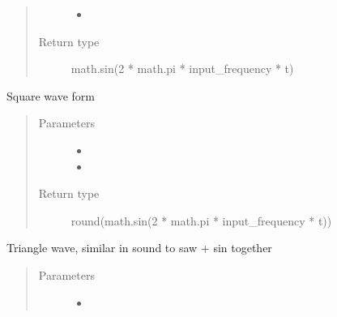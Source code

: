 \documentclass[letterpaper,10pt,english]{sphinxmanual}
\begin{document}
\begin{fulllineitems}
\begin{fulllineitems}
\begin{quote}
\begin{description}
\begin{itemize}
\item {} 
\sphinxAtStartPar
{} \textendash{} 

\end{itemize}

\item[{Return type}] \leavevmode
\sphinxAtStartPar
math.sin(2 * math.pi * input\_frequency * t)

\end{description}\end{quote}

\end{fulllineitems}


\begin{fulllineitems}
\label{\detokenize{audio:audio.wave_table.square}}
\pysigstartsignatures
{}
\pysigstopsignatures
\sphinxAtStartPar
Square wave form
\begin{quote}\begin{description}
\item[{Parameters}] \leavevmode\begin{itemize}
\item {} 
\sphinxAtStartPar
{} \textendash{} 

\item {} 
\sphinxAtStartPar
{} \textendash{} 

\end{itemize}

\item[{Return type}] \leavevmode
\sphinxAtStartPar
round(math.sin(2 * math.pi * input\_frequency * t))

\end{description}\end{quote}

\end{fulllineitems}


\begin{fulllineitems}
\label{\detokenize{audio:audio.wave_table.triangle}}
\pysigstartsignatures
{}
\pysigstopsignatures
\sphinxAtStartPar
Triangle wave, similar in sound to saw + sin together
\begin{quote}\begin{description}
\item[{Parameters}] \leavevmode\begin{itemize}
\item {} 
\sphinxAtStartPar
{} \textendash{} 


\end{itemize}
\end{description}
\end{quote}
\end{fulllineitems}
\end{fulllineitems}
\end{document}
